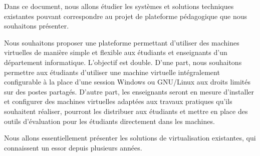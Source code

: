 Dans ce document, nous allons étudier les systèmes et solutions techniques
existantes pouvant correspondre au projet de plateforme pédagogique que nous
souhaitons présenter.

Nous souhaitons proposer une plateforme permettant d'utiliser des machines
virtuelles de manière simple et flexible aux étudiants et enseignants d'un
département informatique. L'objectif est double. D'une part, nous souhaitons
permettre aux étudiants d'utiliser une machine virtuelle intégralement
configurable à la place d'une session Windows ou GNU/Linux aux droits limités
sur des postes partagés. D'autre part, les enseignants seront en mesure
d'installer et configurer des machines virtuelles adaptées aux travaux pratiques
qu'ils souhaitent réaliser, pourront les distribuer aux étudiants et mettre en
place des outils d'évaluation pour les étudiants directement dans les machines.

Nous allons essentiellement présenter les solutions de virtualisation
existantes, qui connaissent un essor depuis plusieurs années.
